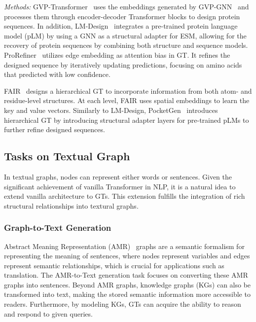 \textit{Methods:}
GVP-Transformer~\cite{hsu2022learning} uses the embeddings generated by GVP-GNN~\cite{jing2021learning} and processes them through encoder-decoder Transformer blocks to design protein sequences. In addition, LM-Design~\cite{zheng2023structure} integrates a pre-trained protein language model (pLM) by using a GNN as a structural adapter for ESM, allowing for the recovery of protein sequences by combining both structure and sequence models.
ProRefiner~\cite{zhou2023prorefiner} utilizes edge embedding as attention bias in GT. It refines the designed sequence by iteratively updating predictions, focusing on amino acids that predicted with low confidence.

FAIR~\cite{zhang2023fullatom} designs a  hierarchical GT to incorporate information from both atom- and residue-level structures. At each level, FAIR uses spatial embeddings to learn the key and value vectors. Similarly to LM-Design, PocketGen~\cite{zhang2024efficient} introduces hierarchical GT by introducing structural adapter layers for pre-trained pLMs to further refine designed sequences.



\subsection{Tasks on Textual Graph}
\label{sec:application-text}
In textual graphs, nodes can represent either words or sentences. %
Given the significant achievement of vanilla Transformer in NLP, 
it is a natural idea to extend vanilla architecture to GTs. 
This extension fulfills the integration of rich structural relationships into textural graphs.

\subsubsection{\textbf{Graph-to-Text Generation}}
Abstract Meaning Representation (AMR)~\cite{banarescu2013abstract} graphs are a semantic formalism for representing the meaning of sentences, where nodes represent variables and edges represent semantic relationships, which is crucial for applications such as translation. The AMR-to-Text generation task focuses on converting these AMR graphs into sentences. Beyond AMR graphs, knowledge graphs (KGs) can also be transformed into text, making the stored semantic information more accessible to readers. Furthermore, by modeling KGs, GTs can acquire the ability to reason and respond to given queries.


